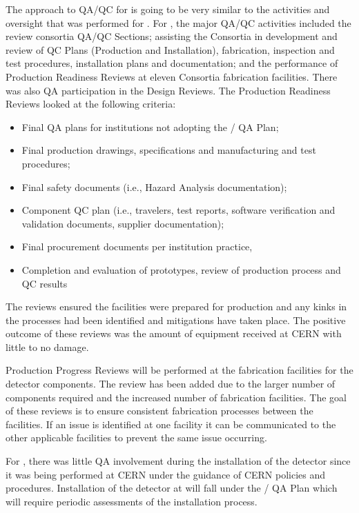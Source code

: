 The approach to QA/QC for  is going to be very similar to the
activities and oversight that was performed for .  For ,
the major QA/QC activities included the review consortia  QA/QC
Sections; assisting the Consortia in development and review of QC
Plans (Production and Installation), fabrication, inspection and test
procedures, installation plans and documentation; and the performance
of Production Readiness Reviews at eleven Consortia fabrication
facilities.  There was also QA participation in the  Design
Reviews.
The Production Readiness Reviews looked at the following criteria:
\begin{itemize}
  \item Final QA plans for institutions not adopting the / QA Plan;
  \item Final production drawings, specifications and manufacturing and test procedures;
  \item Final safety documents (i.e., Hazard Analysis documentation);
  \item Component QC plan (i.e., travelers, test reports, software verification and validation documents, supplier documentation);
  \item Final procurement documents per institution practice,
  \item Completion and evaluation of prototypes, review of production process and QC results
\end{itemize}

The reviews ensured the facilities were prepared for production and
any kinks in the processes had been identified and mitigations have
taken place. The positive outcome of these reviews was the amount of
equipment received at CERN with little to no damage.

Production Progress Reviews will be performed at the fabrication
facilities for the  detector components. The review has
been added due to the larger number of components required and the
increased number of fabrication facilities. The goal of these reviews
is to ensure consistent fabrication processes between the
facilities. If an issue is identified at one facility it can be
communicated to the other applicable facilities to prevent the same
issue occurring.

For , there was little  QA involvement
during the installation of the detector since it was being performed
at CERN under the guidance of CERN policies and
procedures. Installation of the  detector at \surf will
fall under the / QA Plan which will require
periodic assessments of the installation process.
